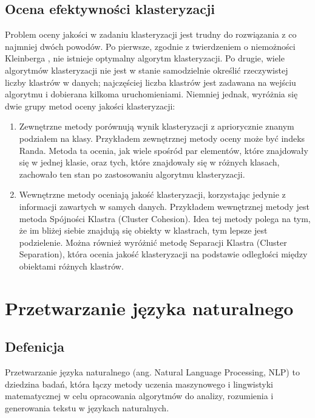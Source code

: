 	\subsection{Ocena efektywności klasteryzacji}
		Problem oceny jakości w zadaniu klasteryzacji jest trudny do rozwiązania z co najmniej dwóch powodów. Po pierwsze, zgodnie z twierdzeniem o niemożności Kleinberga \cite{Kleinberg}, nie istnieje optymalny algorytm klasteryzacji. Po drugie, wiele algorytmów klasteryzacji nie jest w stanie samodzielnie określić rzeczywistej liczby klastrów w danych; najczęściej liczba klastrów jest zadawana na wejściu algorytmu i dobierana kilkoma uruchomieniami.
		Niemniej jednak, wyróżnia się dwie grupy metod oceny jakości klasteryzacji:
		\begin{enumerate}
			\item Zewnętrzne metody porównują wynik klasteryzacji z apriorycznie znanym podziałem na klasy. Przykładem zewnętrznej metody oceny może być indeks Randa. Metoda ta ocenia, jak wiele spośród par elementów, które znajdowały się w jednej klasie, oraz tych, które znajdowały się w różnych klasach, zachowało ten stan po zastosowaniu algorytmu klasteryzacji.
			\item Wewnętrzne metody oceniają jakość klasteryzacji, korzystając jedynie z informacji zawartych w samych danych. Przykładem wewnętrznej metody jest metoda Spójności Klastra (Cluster Cohesion). Idea tej metody polega na tym, że im bliżej siebie znajdują się obiekty w klastrach, tym lepsze jest podzielenie. Można również wyróżnić metodę Separacji Klastra (Cluster Separation), która ocenia jakość klasteryzacji na podstawie odległości między obiektami różnych klastrów.
		\end{enumerate}


\section{Przetwarzanie języka naturalnego}

	\subsection{Defenicja}
		Przetwarzanie języka naturalnego (ang. Natural Language Processing, NLP) to dziedzina badań, która łączy metody uczenia maszynowego i lingwistyki matematycznej w celu opracowania algorytmów do analizy, rozumienia i generowania tekstu w językach naturalnych. \cite{NLP}


